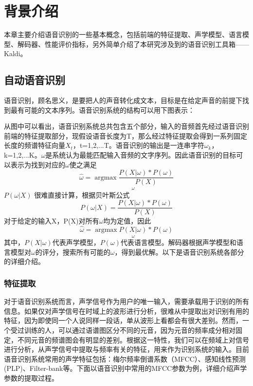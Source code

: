 ﻿%

\chapter{背景介绍}
本章主要介绍语音识别的一些基本概念，包括前端的特征提取、声学模型、语言模型、解码器、性能评价指标，另外简单介绍了本研究涉及到的语音识别工具箱——Kaldi。
\section{自动语音识别}
语音识别，顾名思义，是要把人的声音转化成文本，目标是在给定声音的前提下找到最有可能的文本序列。语音识别系统的结构可以用下图表示：

{\color{red}{\large 补充语音识别系统结构图}}

从图中可以看出，语音识别系统总共包含五个部分，输入的音频首先经过语音识别前端的特征提取部分，现假设语音长度为T，那么经过特征提取会得到一系列固定长度的频谱特征向量$X_{t}$，t=1,2,...T。语音识别的输出是一连串字符$\omega_{k}$，k=1,2,...K。$\omega$是系统认为最能匹配输入音频的文字序列。因此语音识别的目标可以表示为找到对应的$\omega$使之满足
\begin{equation}\widehat{\omega} = \underset{\omega}{\operatorname{argmax} \frac{P(X|\omega)*P(\omega)}{P(X)}}\end{equation}$P(\omega|X)$
很难直接计算，根据贝叶斯公式
\begin{equation}P(\omega|X)=\frac{P(X|\omega)*P(\omega)}{P(X)}\end{equation}
对于给定的输入X，P(X)对所有$\omega$均为定值，因此
\begin{equation}\widehat{\omega} = \underset{\omega}{\operatorname{argmax} P(X|\omega)*P(\omega)}\end{equation}
其中，$P(X|\omega)$代表声学模型，$P(\omega)$代表语言模型。解码器根据声学模型和语言模型对$\omega$的评分，搜索所有可能的$\omega$，得到最优解。以下是语音识别系统各部分的详细介绍。
\subsection{特征提取}
对于语音识别系统而言，声学信号作为用户的唯一输入，需要承载用于识别的所有信息。如果仅对声学信号在时域上的波形进行分析，很难从中提取出对识别有用的特征，因为即使同一个人说同样一段话，单从波形上看都会有很大差别。然而，一个受过训练的人，可以通过语谱图区分不同的元音，因为元音的频率成分相对固定，不同元音的频谱图会有明显的差别。根据这一特性，我们可以在频域上对信号进行分析，从声学信号中提取与频率有关的特征，用来作为识别系统的输入。目前语音识别系统常用的声学特征包括：梅尔频率倒谱系数（MFCC）、感知线性预测(PLP)、Filter-bank等。下面以语音识别中常用的MFCC参数为例，详细介绍声学参数的提取过程。

